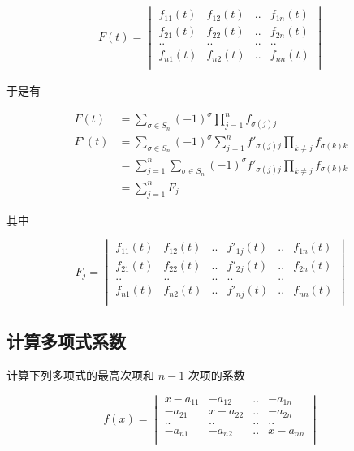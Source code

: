 \documentclass[12pt,a4paper]{ctexart}
\begin{document}
\begin{align*}
    F(t) = \begin{vmatrix}
        f_{11}(t) & f_{12}(t) & .. & f_{1n}(t) \\
        f_{21}(t) & f_{22}(t) & .. & f_{2n}(t) \\
        .. & .. &.. &..  \\
        f_{n1}(t) & f_{n2}(t) & .. & f_{nn}(t) \\
    \end{vmatrix}
\end{align*}

于是有

\begin{align*}
    F(t) &= \sum_{\sigma \in S_n} (-1)^{\sigma} \prod_{j=1}^{n}f_{\sigma(j)j} \\
    F'(t) &= \sum_{\sigma \in S_n} (-1)^{\sigma} \sum_{j=1}^{n}f'_{\sigma(j)j}\prod_{k \ne j}f_{ \sigma(k)k} \\
    &= \sum_{j=1}^{n}\sum_{\sigma \in S_n} (-1)^{\sigma} f'_{\sigma(j)j}\prod_{k \ne j}f_{\sigma(k)k} \\
    &= \sum_{j=1}^{n}F_j
\end{align*}

其中 

\[
F_j = \begin{vmatrix}
    f_{11}(t) & f_{12}(t) & .. & f'_{1j}(t) & .. & f_{1n}(t) \\
    f_{21}(t) & f_{22}(t) & .. & f'_{2j}(t) &.. & f_{2n}(t) \\
    .. & .. &.. &.. & .. \\
    f_{n1}(t) & f_{n2}(t) & .. & f'_{nj}(t) & .. & f_{nn}(t) \\
\end{vmatrix}
\]

\subsection{计算多项式系数}

计算下列多项式的最高次项和 $n-1$ 次项的系数

\[
f(x) = \begin{vmatrix}
    x-a_{11} & -a_{12} & .. & -a_{1n} \\
    -a_{21} & x-a_{22} & .. & -a_{2n} \\
    .. & .. & .. & .. \\
    -a_{n1} & -a_{n2} & .. & x-a_{nn} \\
\end{vmatrix}
\]
\end{document}
